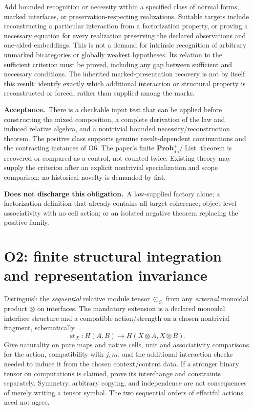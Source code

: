 \documentclass[11pt,a4paper]{article}
\newcommand{\st}{\operatorname{st}}
\newcommand{\Prob}{\mathbf{Prob}^{+}_{\mathrm{fin}}}
\newcommand{\List}{\operatorname{List}}
\newcommand{\accept}{\par\textbf{Acceptance.}\ }
\newcommand{\notaccepted}{\par\textbf{Does not discharge this obligation.}\ }
\begin{document}
Add bounded recognition or necessity within a specified class of normal
forms, marked interfaces, or preservation-respecting realizations. Suitable
targets include reconstructing a particular interaction from a factorization
property, or proving a necessary equation for every realization preserving
the declared observations and one-sided embeddings. This is not a demand
for intrinsic recognition of arbitrary unmarked bicategories or globally
weakest hypotheses. Its relation to the sufficient criterion must be proved,
including any gap between sufficient and necessary conditions.
The inherited marked-presentation recovery is not by itself this result:
identify exactly which additional interaction or structural property is
reconstructed or forced, rather than supplied among the marks.

\accept There is a checkable input test that can be applied before constructing
the mixed composition, a complete derivation of the law and induced
relative algebra, and a nontrivial bounded necessity/reconstruction theorem.
The positive class supports genuine result-dependent continuations and the
contrasting instances of O6. The paper's finite \(\Prob/\List\) theorem is
recovered or compared as a control, not counted twice. Existing theory may
supply the criterion after an explicit nontrivial specialization and scope
comparison; no historical novelty is demanded by fiat.

\notaccepted A law-supplied factory alone; a factorization definition that
already contains all target coherence; object-level associativity with no
cell action; or an isolated negative theorem replacing the positive family.

\section{O2: finite structural integration and representation invariance}\label{sec:o2}

Distinguish the \emph{sequential} relative module tensor \(\odot_C\) from any
\emph{external} monoidal product \(\otimes\) on interfaces. The mandatory
extension is a declared monoidal interface structure and a compatible
action/strength on a chosen nontrivial fragment, schematically
\[
 \st_X:H(A,B)\longrightarrow H(X\otimes A,X\otimes B).
\]
Give naturality on pure maps and native cells, unit and associativity
comparisons for the action, compatibility with \(j,m\), and the additional
interaction checks needed to induce it from the chosen context/content data.
If a stronger binary tensor on computations is claimed, prove its interchange
and constraints separately. Symmetry, arbitrary copying, and independence
are not consequences of merely writing a tensor symbol. The two sequential
orders of effectful actions need not agree.
\end{document}
